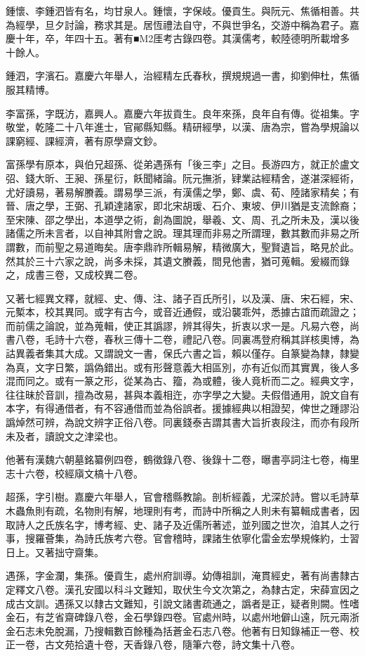 \begin{pinyinscope}
鍾懷、李鍾泗皆有名，均甘泉人。鍾懷，字保岐。優貢生。與阮元、焦循相善。共為經學，旦夕討論，務求其是。居恆禮法自守，不與世爭名，交游中稱為君子。嘉慶十年，卒，年四十五。著有■M2厓考古錄四卷。其漢儒考，較陸德明所載增多十餘人。

鍾泗，字濱石。嘉慶六年舉人，治經精左氏春秋，撰規規過一書，抑劉伸杜，焦循服其精博。

李富孫，字既汸，嘉興人。嘉慶六年拔貢生。良年來孫，良年自有傳。從祖集。字敬堂，乾隆二十八年進士，官鄖縣知縣。精研經學，以漢、唐為宗，嘗為學規論以課窮經、課經濟，著有原學齋文鈔。

富孫學有原本，與伯兄超孫、從弟遇孫有「後三李」之目。長游四方，就正於盧文弨、錢大昕、王昶、孫星衍，飫聞緒論。阮元撫浙，肄業詁經精舍，遂湛深經術，尤好讀易，著易解賸義。謂易學三派，有漢儒之學，鄭、虞、荀、陸諸家精矣；有晉、唐之學，王弼、孔穎達諸家，即北宋胡瑗、石介、東坡、伊川猶是支流餘裔；至宋陳、邵之學出，本道學之術，創為圖說，舉羲、文、周、孔之所未及，漢以後諸儒之所未言者，以自神其附會之說。理其理而非易之所謂理，數其數而非易之所謂數，而前聖之易道晦矣。唐李鼎祚所輯易解，精微廣大，聖賢遺旨，略見於此。然其於三十六家之說，尚多未採，其遺文賸義，間見他書，猶可蒐輯。爰綴而錄之，成書三卷，又成校異二卷。

又著七經異文釋，就經、史、傳、注、諸子百氏所引，以及漢、唐、宋石經，宋、元槧本，校其異同。或字有古今，或音近通假，或沿襲乖舛，悉據古誼而疏證之；而前儒之論說，並為蒐輯，使正其譌謬，辨其得失，折衷以求一是。凡易六卷，尚書八卷，毛詩十六卷，春秋三傳十二卷，禮記八卷。同裏馮登府稱其詳核奧博，為詁異義者集其大成。又謂說文一書，保氏六書之旨，賴以僅存。自篆變為隸，隸變為真，文字日繁，譌偽錯出。或有形聲意義大相區別，亦有近似而其實異，後人多混而同之。或有一篆之形，從某為古、籀，為或體，後人竟析而二之。經典文字，往往昧於音訓，擅為改易，甚與本義相迕，亦字學之大變。夫假借通用，說文自有本字，有得通借者，有不容通借而並為俗誤者。援據經典以相證契，俾世之踵謬沿譌焯然可辨，為說文辨字正俗八卷。同裏錢泰吉謂其書大旨折衷段注，而亦有段所未及者，讀說文之津梁也。

他著有漢魏六朝墓銘纂例四卷，鶴徵錄八卷、後錄十二卷，曝書亭詞注七卷，梅里志十六卷，校經廎文槁十八卷。

超孫，字引樹。嘉慶六年舉人，官會稽縣教諭。剖析經義，尤深於詩。嘗以毛詩草木蟲魚則有疏，名物則有解，地理則有考，而詩中所稱之人則未有纂輯成書者，因取詩人之氏族名字，博考經、史、諸子及近儒所著述，並列國之世次，洎其人之行事，搜羅薈集，為詩氏族考六卷。官會稽時，課諸生依寧化雷金宏學規條約，士習日上。又著拙守齋集。

遇孫，字金瀾，集孫。優貢生，處州府訓導。幼傳祖訓，淹貫經史，著有尚書隸古定釋文八卷。漢孔安國以科斗文難知，取伏生今文次第之，為隸古定，宋薛宣因之成古文訓。遇孫又以隸古文難知，引說文諸書疏通之，譌者是正，疑者則闕。性嗜金石，有芝省齋碑錄八卷，金石學錄四卷。官處州時，以處州地僻山遠，阮元兩浙金石志未免脫漏，乃搜輯數百餘種為括蒼金石志八卷。他著有日知錄補正一卷、校正一卷，古文苑拾遺十卷，天香錄八卷，隨筆六卷，詩文集十八卷。


\end{pinyinscope}
